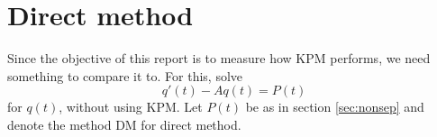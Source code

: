 \section{Direct method} \label{sec:DM}
Since the objective of this report is to measure how KPM performs, we need something to compare it to. For this, solve 
\begin{equation} \label{eqn:DI}
q'(t) -A q(t) = P(t)
\end{equation}
for $q(t)$, without using KPM. Let $P(t)$ be as in section \ref{sec:nonsep} and denote the method DM for direct method.
